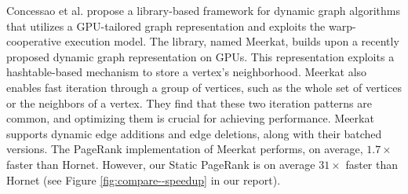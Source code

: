 Concessao et al. \cite{concessao2023meerkat} propose a library-based framework for dynamic graph algorithms that utilizes a GPU-tailored graph representation and exploits the warp-cooperative execution model. The library, named Meerkat, builds upon a recently proposed dynamic graph representation on GPUs. This representation exploits a hashtable-based mechanism to store a vertex’s neighborhood. Meerkat also enables fast iteration through a group of vertices, such as the whole set of vertices or the neighbors of a vertex. They find that these two iteration patterns are common, and optimizing them is crucial for achieving performance. Meerkat supports dynamic edge additions and edge deletions, along with their batched versions. The PageRank implementation of Meerkat performs, on average, $1.7\times$ faster than Hornet. However, our Static PageRank is on average $31\times$ faster than Hornet (see Figure \ref{fig:compare--speedup} in our report).

